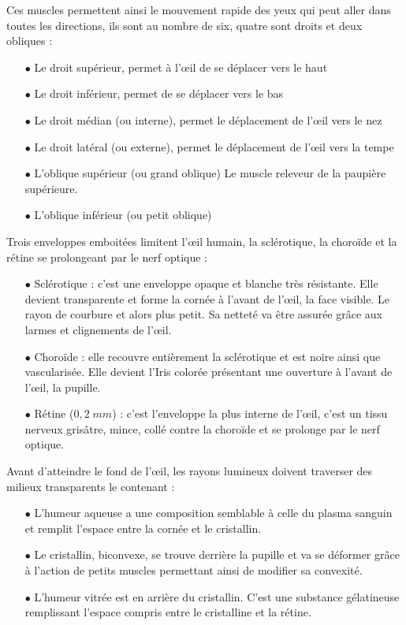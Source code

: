 \documentclass[a4paper, 12pt, onecolumn, openany]{report}
\begin{document}
    Ces muscles permettent ainsi le mouvement rapide des yeux qui peut aller dans toutes les directions, ils sont au nombre de six, quatre sont droits et deux obliques :        
    \begin{itemize}
    \item[$\bullet$] Le droit supérieur, permet à l’œil de se déplacer vers le haut
	\item[$\bullet$] Le droit inférieur, permet de se déplacer vers le bas
	\item[$\bullet$] Le droit médian (ou interne), permet le déplacement de l’œil vers le nez
	\item[$\bullet$] Le droit latéral (ou externe), permet le déplacement de l’œil vers la tempe
	\item[$\bullet$] L’oblique supérieur (ou grand oblique) Le muscle releveur de la paupière supérieure. 
	\item[$\bullet$] L’oblique inférieur (ou petit oblique) 
	\end{itemize}		
    Trois enveloppes emboitées limitent l’œil humain, la sclérotique, la choroïde et la rétine se prolongeant par le nerf optique :
    \begin{itemize}
	\item[$\bullet$] Sclérotique : c’est une enveloppe opaque et blanche très résistante. Elle devient transparente et forme la cornée à l’avant de l’œil, la face visible. Le rayon de courbure et alors plus petit. Sa netteté va être assurée grâce aux larmes et clignements de l’œil.
	\item[$\bullet$] Choroïde : elle recouvre entièrement la sclérotique et est noire ainsi que vascularisée. Elle devient l’Iris colorée présentant une ouverture à l’avant de l’œil, la pupille.  
	\item[$\bullet$] Rétine ($0,2 \; mm$) : c’est l’enveloppe la plus interne de l’œil, c’est un tissu nerveux grisâtre, mince, collé contre la choroïde et se prolonge par le nerf optique. 
	\end{itemize}	
Avant d’atteindre le fond de l’œil, les rayons lumineux doivent traverser des milieux transparents le contenant :
	\begin{itemize}
	\item[$\bullet$] L’humeur aqueuse a une composition semblable à celle du plasma sanguin et remplit l’espace entre la cornée et le cristallin.
	\item[$\bullet$] Le cristallin, biconvexe, se trouve derrière la pupille et va se déformer grâce à l’action de petits muscles permettant ainsi de modifier sa convexité.
	\item[$\bullet$] L’humeur vitrée est en arrière du cristallin. C’est une substance gélatineuse remplissant l'espace compris entre le cristalline et la rétine.
	\end{itemize}
	
\end{document}
